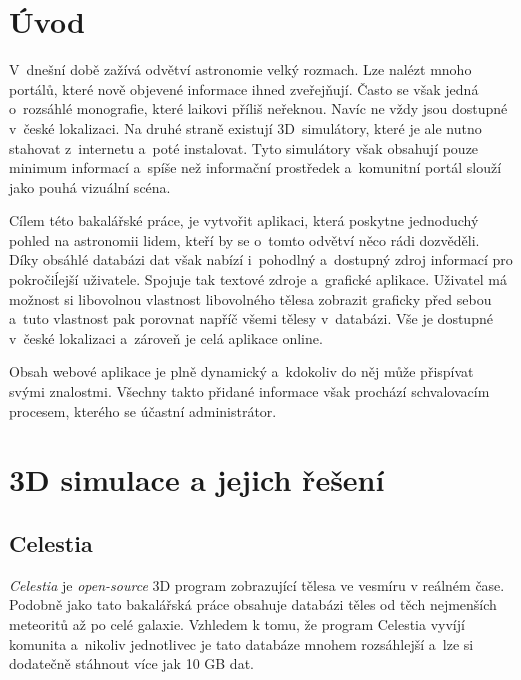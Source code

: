 \documentclass[a4paper,12pt]{article}
\begin{document}
\clearpage
\pagestyle{plain}		%

 {}
\section*{Úvod}
\label{uvod}

V~dnešní době zažívá odvětví astronomie velký rozmach. Lze nalézt mnoho portálů, které nově objevené informace ihned zveřejňují. Často se však jedná o~rozsáhlé monografie, které laikovi příliš neřeknou. Navíc ne vždy jsou dostupné v~české lokalizaci. Na druhé straně existují 3D~simulátory, které je ale nutno stahovat z~internetu a~poté instalovat. Tyto simulátory však obsahují pouze minimum informací a~spíše než informační prostředek a~komunitní portál slouží jako pouhá vizuální scéna.

Cílem této bakalářské práce, je vytvořit aplikaci, která poskytne jednoduchý pohled na astronomii lidem, kteří by se o~tomto odvětví něco rádi  dozvěděli. Díky obsáhlé databázi dat však nabízí i~pohodlný a~dostupný zdroj informací pro pokročiĺejší uživatele. Spojuje tak textové zdroje a~grafické aplikace. Uživatel má možnost 
si libovolnou vlastnost libovolného tělesa zobrazit graficky před sebou a~tuto vlastnost pak porovnat napříč všemi tělesy v~databázi. Vše je dostupné v~české lokalizaci a~zároveň je celá aplikace online.

Obsah webové aplikace je plně dynamický a~kdokoliv do něj může přispívat svými znalostmi. Všechny takto přidané informace však prochází schvalovacím procesem, kterého se účastní administrátor.



\section{3D simulace a jejich řešení}



\subsection{Celestia}

\textit{Celestia} je \textit{open-source} 3D program zobrazující tělesa ve vesmíru v reálném čase. Podobně jako tato bakalářská práce obsahuje databázi těles od těch nejmenších meteoritů až po celé galaxie. Vzhledem k tomu, že program Celestia vyvíjí komunita a~nikoliv jednotlivec je tato databáze mnohem rozsáhlejší a~lze si dodatečně stáhnout více jak 10 GB dat.
\end{document}
